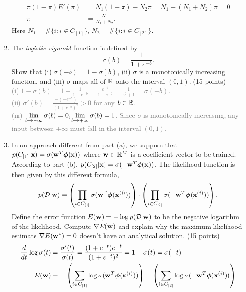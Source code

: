 \documentclass[12pt,a4paper]{article}
\newcommand{\gray}[1]{\textcolor{gray}{#1}}
\renewcommand{\v}[1]{\ifmmode\mathbf{#1}\fi}
\newcommand{\ra}[1]{\ifnum #1=1\rightarrow\fi\ifnum #1=2\Rightarrow\fi\ifnum #1=3\Rrightarrow\fi\ifnum #1=4\rightrightarrows\fi\ifnum #1=5\rightleftarrows\fi\ifnum #1=6\mapsto\fi\ifnum #1=7\iffalse\fi\fi\ifnum #1=8\twoheadrightarrow\fi\ifnum #1=9\rightharpoonup\fi\ifnum #1=0\rightharpoondown\fi}
\renewcommand{\l}{\left}
\renewcommand{\r}{\right}
\def\R{\ifmmode\mathbb R\fi}
\newcommand{\solution}[1]{\gray{#1}}
\begin{document}
\begin{enumerate}[label=(\alph*)]
{\begin{align*}
\pi(1-\pi) E'(\pi) &= N_1 (1-\pi) - N_2 \pi = N_1 - (N_1 + N_2) \pi = 0 \\
\pi & = \frac{N_1}{N_1 + N_2}.
\end{align*}
Here $N_1 = \#\{i : i \in C_{[1]} \}$, $N_2 = \#\{i : i \in C_{[2]} \}$.
}
%
\item The \textit{logistic sigmoid} function is defined by
\begin{equation*}
\sigma(b) = \frac1{1+e^{-b}}.
\end{equation*}
Show that (i) $\sigma(-b) = 1-\sigma(b)$, (ii) $\sigma$ is a monotonically increasing function, and (iii) $\sigma$ maps all of $\R$ onto the interval $(0, 1)$. (15 points) \\
\solution{
(i) $\displaystyle 1-\sigma(b) = 1-\frac1{1+e^{-b}} = \frac{e^{-b}}{1+e^{-b}} = \frac{1}{e^{b} + 1} = \sigma(-b)$. \\
(ii) $\displaystyle \sigma'(b) = \frac{-(-e^{-b})}{(1+e^{-b})^2} > 0$ for any $b \in \R$. \\
(iii) $\displaystyle\lim_{b\ra1-\infty}\sigma(b) = 0, \lim_{b\ra1+\infty} \sigma(b) = 1$. Since $\sigma$ is monotonically increasing, any input between $\pm\infty$ must fall in the interval $(0, 1)$.
}
%
\item In an approach different from part (a), we suppose that $p(C_{[1]} \vert \v x) = \sigma(\v w^T \boldsymbol\phi(\v x))$ where $\v w \in \R^M$ is a coefficient vector to be trained. According to part (b), $p(C_{[2]} \vert \v x) = \sigma(-\v w^T \boldsymbol\phi(\v x))$. The likelihood function is then given by this different formula,
\begin{equation*}
p(\mathcal D \vert \v w) = \l(\prod_{i\in C_{[1]}} \sigma(\v w^T \boldsymbol\phi(\v x^{(i)}))\r) \cdot \l(\prod_{i\in C_{[2]}} \sigma( - \v w^T \boldsymbol\phi(\v x^{(i)}))\r).
\end{equation*}
Define the error function $E(\v w) = -\log p(\mathcal D \vert \v w)$ to be the negative logarithm of the likelihood. Compute $\nabla E(\v w)$ and explain why the maximum likelihood estimate $\nabla E(\v w^\ast) = 0$ doesn't have an analytical solution. (15 points) 
\solution{
\begin{align*}
\frac{d}{dt}\log\sigma(t) &= \frac{\sigma'(t)}{\sigma(t)} = \frac{(1+e^{-t})e^{-t}}{(1+e^{-t})^2} = 1 - \sigma(t) = \sigma(-t)\\
E(\v w) & = -\l(\sum_{i\in C_{[1]}} \log\sigma(\v w^T \boldsymbol\phi(\v x^{(i)}))\r) - \l(\sum_{i\in C_{[2]}} \log \sigma( - \v w^T \boldsymbol\phi(\v x^{(i)}))\r) \\

\end{align*}}
\end{enumerate}
\end{document}
